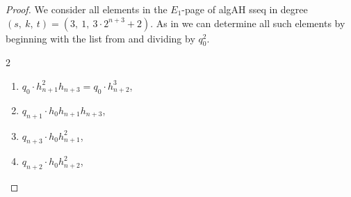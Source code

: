 \begin{proof}
  We consider all elements in the $E_1$-page of algAH sseq in degree 
  $ (s, \ k, \ t)=(3, \ 1, \ 3\cdot 2^{n+3} + 2) $.
  As in  we can determine all such elements by beginning with the list from  and dividing by $q_0^2$.
    

\begin{multicols}{2}
\begin{enumerate}
\item $q_0 \cdot h_{n+1}^2h_{n+3} = q_0 \cdot h_{n+2}^3$,
\item $q_{n+1} \cdot h_0h_{n+1}h_{n+3}$,
\item $q_{n+3} \cdot h_0h_{n+1}^2$,
\item $q_{n+2} \cdot h_0h_{n+2}^2$,

\end{enumerate}
\end{multicols}
\end{proof}
